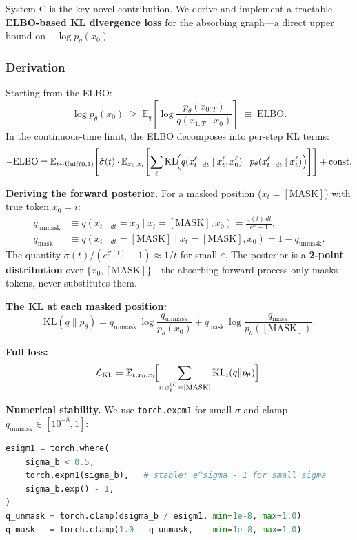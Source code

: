 \documentclass[11pt,a4paper]{article}
\begin{document}
System C is the key novel contribution. We derive and implement a tractable \textbf{ELBO-based KL divergence loss} for the absorbing graph---a direct upper bound on $-\log p_\theta(x_0)$.

\subsubsection*{Derivation}

Starting from the ELBO:
\[
  \log p_\theta(x_0) \;\geq\; \mathbb{E}_q\!\left[\log \frac{p_\theta(x_{0:T})}{q(x_{1:T} \mid x_0)}\right] \;\equiv\; \mathrm{ELBO}.
\]
In the continuous-time limit, the ELBO decomposes into per-step KL terms:
\[
  -\mathrm{ELBO} = \mathbb{E}_{t \sim \mathrm{Unif}(0,1)}\!\left[\dot{\sigma}(t) \cdot \mathbb{E}_{x_0, x_t}\!\left[\sum_\ell \mathrm{KL}\!\Bigl(q(x_{t-dt}^\ell \mid x_t^\ell, x_0^\ell) \,\|\, p_\theta(x_{t-dt}^\ell \mid x_t^\ell)\Bigr)\right]\right] + \text{const}.
\]

\textbf{Deriving the forward posterior.} For a masked position ($x_t = [\text{MASK}]$) with true token $x_0 = i$:
\begin{align*}
  q_\text{unmask} &\equiv q(x_{t-dt} = x_0 \mid x_t = [\text{MASK}], x_0) = \frac{\dot{\sigma}(t)\,dt}{e^{\sigma} - 1}, \\
  q_\text{mask}   &\equiv q(x_{t-dt} = [\text{MASK}] \mid x_t = [\text{MASK}], x_0) = 1 - q_\text{unmask}.
\end{align*}
The quantity $\dot{\sigma}(t)/(e^{\sigma(t)} - 1) \approx 1/t$ for small $\varepsilon$. The posterior is a \textbf{2-point distribution} over $\{x_0, [\text{MASK}]\}$---the absorbing forward process only masks tokens, never substitutes them.

\textbf{The KL at each masked position:}
\[
  \mathrm{KL}(q \| p_\theta) = q_\text{unmask}\,\log\frac{q_\text{unmask}}{p_\theta(x_0)} + q_\text{mask}\,\log\frac{q_\text{mask}}{p_\theta([\text{MASK}])}.
\]

\textbf{Full loss:}
\[
  \mathcal{L}_\text{KL} = \mathbb{E}_{t, x_0, x_t}\!\Bigl[\sum_{i:\, x_t^{(i)} = [\text{MASK}]} \mathrm{KL}_i(q \| p_\theta)\Bigr].
\]

\textbf{Numerical stability.} We use \texttt{torch.expm1} for small $\sigma$ and clamp $q_\text{unmask} \in [10^{-8}, 1]$:
\begin{lstlisting}[language=Python]
esigm1 = torch.where(
    sigma_b < 0.5,
    torch.expm1(sigma_b),   # stable: e^sigma - 1 for small sigma
    sigma_b.exp() - 1,
)
q_unmask = torch.clamp(dsigma_b / esigm1, min=1e-8, max=1.0)
q_mask   = torch.clamp(1.0 - q_unmask,    min=1e-8, max=1.0)
\end{lstlisting}
\end{document}
